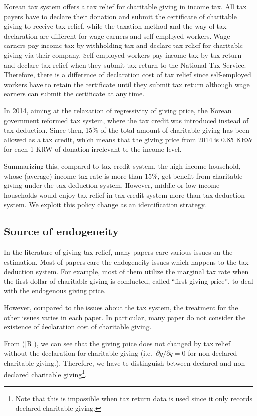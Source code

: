 \documentclass[
  11pt,
  a4paper,
]{article}
\begin{document}
Korean tax system offers a tax relief for charitable giving in income tax. All tax payers have to declare their donation and submit the certificate of charitable giving to receive tax relief, while the taxation method and the way of tax declaration are different for wage earners and self-employed workers. Wage earners pay income tax by withholding tax and declare tax relief for charitable giving via their company. Self-employed workers pay income tax by tax-return and declare tax relief when they submit tax return to the National Tax Service. Therefore, there is a difference of declaration cost of tax relief since self-employed workers have to retain the certificate until they submit tax return although wage earners can submit the certificate at any time.

In 2014, aiming at the relaxation of regressivity of giving price, the Korean government reformed tax system, where the tax credit was introduced instead of tax deduction. Since then, 15\% of the total amount of charitable giving has been allowed as a tax credit, which means that the giving price from 2014 is 0.85 KRW for each 1 KRW of donation irrelevant to the income level.

Summarizing this, compared to tax credit system, the high income household, whose (average) income tax rate is more than 15\%, get benefit from charitable giving under the tax deduction system. However, middle or low income households would enjoy tax relief in tax credit system more than tax deduction system. We exploit this policy change as an identification strategy.

\hypertarget{source-of-endogeneity}{%
\subsection{Source of endogeneity}\label{source-of-endogeneity}}

In the literature of giving tax relief, many papers care various issues on the estimation. Most of papers care the endogeneity issues which happens to the tax deduction system. For example, most of them utilize the marginal tax rate when the first dollar of charitable giving is conducted, called ``first giving price'', to deal with the endogenous giving price.

However, compared to the issues about the tax system, the treatment for the other issues varies in each paper. In particular, many paper do not consider the existence of declaration cost of charitable giving.

From (\ref{R}), we can see that the giving price does not changed by tax relief without the declaration for charitable giving (i.e.~\(\partial g/\partial q=0\) for non-declared charitable giving.). Therefore, we have to distinguish between declared and non-declared charitable giving\footnote{Note that this is impossible when tax return data is used since it only records declared charitable giving.}.
\end{document}
